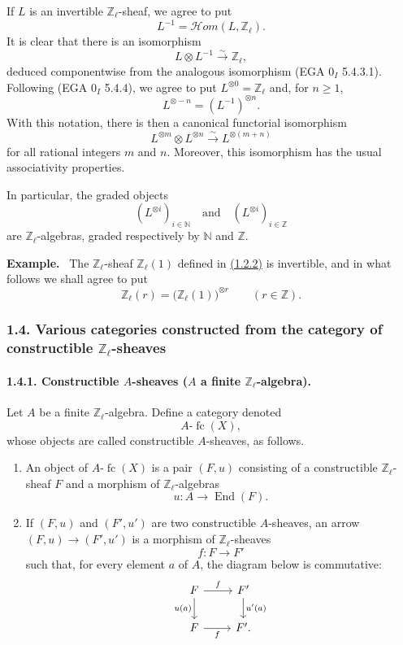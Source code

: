 \documentclass[11pt]{article}
\newenvironment{statement}[1]{\par\medskip\noindent\textbf{#1.}\ }{\par\medskip}
\providecommand{\End}{\operatorname{End}}
\providecommand{\End}{\operatorname{End}}
\providecommand{\cHom}{\mathcal{H}om}
\providecommand{\fc}{\operatorname{fc}}
\begin{document}
If \(L\) is an invertible \(\mathbb Z_\ell\)-sheaf, we agree to put
\[
L^{-1}=\cHom(L,\mathbb Z_\ell).
\]
It is clear that there is an isomorphism
\[
L\otimes L^{-1}\xrightarrow{\sim}\mathbb Z_\ell,
\]
deduced componentwise from the analogous isomorphism (EGA \(0_I\) 5.4.3.1). Following (EGA \(0_I\) 5.4.4), we agree to put \(L^{\otimes0}=\mathbb Z_\ell\) and, for \(n\ge1\),
\[
L^{\otimes -n}=(L^{-1})^{\otimes n}.
\]
With this notation, there is then a canonical functorial isomorphism
\[
L^{\otimes m}\otimes L^{\otimes n}\xrightarrow{\sim}L^{\otimes(m+n)}
\]
for all rational integers \(m\) and \(n\). Moreover, this isomorphism has the usual associativity properties.

In particular, the graded objects
\[
(L^{\otimes i})_{i\in\mathbb N}\quad\text{and}\quad(L^{\otimes i})_{i\in\mathbb Z}
\]
are \(\mathbb Z_\ell\)-algebras, graded respectively by \(\mathbb N\) and \(\mathbb Z\).

\begin{statement}{Example}
The \(\mathbb Z_\ell\)-sheaf \(\mathbb Z_\ell(1)\) defined in \hyperref[sga5:VI:example:1.2.2]{(1.2.2)} is invertible, and in what follows we shall agree to put
\[
\mathbb Z_\ell(r)=\bigl(\mathbb Z_\ell(1)\bigr)^{\otimes r}\qquad (r\in\mathbb Z).
\]
\end{statement}

\subsubsection*{1.4. Various categories constructed from the category of constructible \(\mathbb Z_\ell\)-sheaves}\label{sga5:VI:subsubsection:1.4}

\paragraph{1.4.1. Constructible \(A\)-sheaves (\(A\) a finite \(\mathbb Z_\ell\)-algebra).}\label{sga5:VI:paragraph:1.4.1}
Let \(A\) be a finite \(\mathbb Z_\ell\)-algebra. Define a category denoted
\[
A\text{-}\fc(X),
\]
whose objects are called constructible \(A\)-sheaves, as follows.

\begin{enumerate}[label=(\roman*)]
\item An object of \(A\text{-}\fc(X)\) is a pair \((F,u)\) consisting of a constructible \(\mathbb Z_\ell\)-sheaf \(F\) and a morphism of \(\mathbb Z_\ell\)-algebras
\[
u:A\longrightarrow \End(F).
\]
\item If \((F,u)\) and \((F',u')\) are two constructible \(A\)-sheaves, an arrow \((F,u)\to(F',u')\) is a morphism of \(\mathbb Z_\ell\)-sheaves
\[
f:F\longrightarrow F'
\]
such that, for every element \(a\) of \(A\), the diagram below is commutative:
\[
\begin{tikzcd}
F \arrow[r,"f"] \arrow[d,"u(a)"'] & F' \arrow[d,"u'(a)"]\\
F \arrow[r,"f"'] & F'.
\end{tikzcd}
\]
\end{enumerate}
\end{document}
